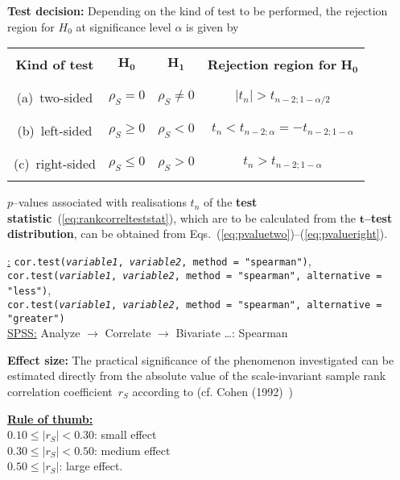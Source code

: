 \medskip
\noindent
\textbf{Test decision:} Depending on the kind of test to be 
performed, the rejection region for $H_{0}$ at significance level 
$\alpha$ is given by
%
\begin{center}
\begin{tabular}[h]{c|c|c|c}
 & & & \\
\textbf{Kind of test} & $\boldsymbol{H_{0}}$ &
$\boldsymbol{H_{1}}$ &
\textbf{Rejection region for} $\boldsymbol{H_{0}}$ \\
 & & & \\
\hline
 & & & \\
(a)~two-sided & $\rho_{S}=0$ & $\rho_{S} \neq 0$ &
$|t_{n}|>t_{n-2;1-\alpha/2}$ \\
 & & & \\
\hline
 & & & \\
(b)~left-sided & $\rho_{S} \geq 0$ & $\rho_{S}<0$ &
$t_{n}<t_{n-2;\alpha}=-t_{n-2;1-\alpha}$ \\
 & & & \\
\hline
 & & & \\
(c)~right-sided & $\rho_{S} \leq 0$ & $\rho_{S}>0$ &
$t_{n}>t_{n-2;1-\alpha}$ \\
 & & &
\end{tabular}
\end{center}
%
$p$--values associated with realisations $t_{n}$ of the
\textbf{test statistic}~(\ref{eq:rankcorrelteststat}), which are to
be calculated from the
$\boldsymbol{t}$\textbf{--test distribution}, can be obtained from 
Eqs.~(\ref{eq:pvaluetwo})--(\ref{eq:pvalueright}).

\medskip
\noindent
\underline{\R:} \texttt{cor.test(\textit{variable1},
\textit{variable2}, method = "spearman")}, \\
\texttt{cor.test(\textit{variable1}, \textit{variable2}, 
method = "spearman", alternative = "less")}, \\
\texttt{cor.test(\textit{variable1}, \textit{variable2}, 
method = "spearman", alternative = "greater")} \\
\underline{SPSS:} Analyze $\rightarrow$ Correlate
$\rightarrow$ Bivariate \ldots: Spearman

\medskip
\noindent
\textbf{Effect size:} The practical significance of the phenomenon investigated can be estimated directly from the absolute value of
the scale-invariant sample rank correlation coefficient~$r_{S}$
according to (cf. Cohen (1992)~)

\medskip
\noindent
\underline{\textbf{Rule of thumb:}}\\
$0.10 \leq |r_{S}| < 0.30$: small effect\\
$0.30 \leq |r_{S}| < 0.50$: medium effect\\
$0.50 \leq |r_{S}|$: large effect.


